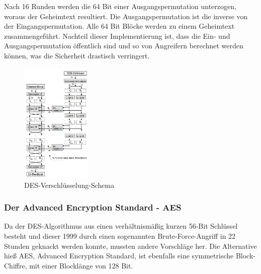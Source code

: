 \documentclass[11pt]{scrartcl}
\begin{document}
\grqq{}Nach 16 Runden werden die 64 Bit einer Ausgangspermutation unterzogen\grqq{}\cite{2}, woraus der Geheimtext resultiert. Die Ausgangspermutation ist die inverse von der Eingangspermutation. Alle 64 Bit Blöcke werden zu einem Geheimtext zusammengeführt. Nachteil dieser Implementierung ist, dass die Ein- und Ausgangspermutation öffentlich sind und so von Angreifern berechnet werden können, was die Sicherheit drastisch verringert. \cite{2}\cite{4}
\begin{figure}[H]
\includegraphics[width=0.30\textwidth]{Bilder/DES/DES_Schema}
	\caption{DES-Verschlüsselung-Schema \cite{3}}
	\label{fig5}
\end{figure}

\subsubsection{Der Advanced Encryption Standard - AES}
\label{sec:advanced-encryotion-standard}
Da der DES-Algorithmus aus einen verhältnismäßig kurzen 56-Bit Schlüssel besteht und dieser 1999 durch einen sogenannten Brute-Force-Angriff in 22 Stunden geknackt werden konnte, mussten andere Vorschläge her. Die Alternative hieß AES, Advanced Encryption Standard, ist ebenfalls eine symmetrische Block-Chiffre, mit einer Blocklänge von 128 Bit. \cite{3}\\
\end{document}
